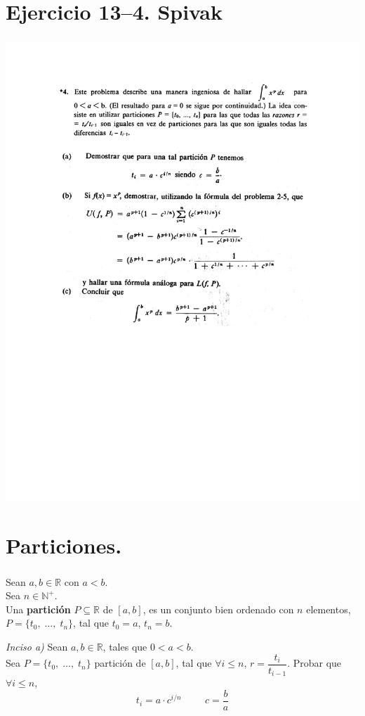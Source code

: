 \documentclass{beamer}
\begin{document}
\portada

\section[Enunciado]{Ejercicio 13--4. Spivak} %
\begin{frame}[t]
	\frametitle{\secname}
	\centering 
	\includegraphics[width= 0.7 \linewidth, page = 1]{IMAGES/PORTADA/13-4-spivak.pdf}
\end{frame}

\section[Inciso A.]{Particiones.} %
\begin{frame}[t]
	\frametitle{\secname}
	\begin{definition}
		Sean \(a,b \in \mathbb{R}\) con \(a<b\). \\ 
		Sea \(n \in \mathbb{N} ^ +\). \\ 
		Una \textbf{partición} \(P \subseteq \mathbb{R}\) de \([a,b]\),
		es un conjunto bien ordenado con \(n\) elementos,
		\(P = \{t_0, \;\ldots,\; t_n\}\), tal que \(t_0 = a\), \(t_n = b\).
	\end{definition}
	\begin{block}{\it Inciso a)}
		Sean \(a,b \in \mathbb{R}\), tales que \(0 < a < b\). \\
		Sea \(P = \{t_0, \;\ldots,\; t_n\}\) partición de \([a,b]\),
		tal que \(\forall i \leqslant n\),
		\(r = \dfrac{t_i}{t_{i-1}}\).
		\pause
		Probar que \(\forall i \leqslant  n\),
		\[
			t_i = a \cdot c ^ {i / n} \hspace{1cm} c = \dfrac{b}{a}
		\]
	\end{block}
\end{frame}
\end{document}
